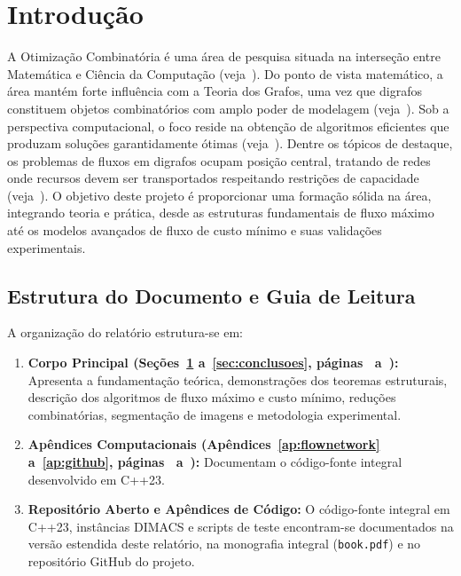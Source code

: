 \section{Introdução}\label{sec:introducao}
A Otimização Combinatória é uma área de pesquisa situada na interseção entre Matemática e Ciência da Computação (veja~\cite{korte2018combinatorial}). Do ponto de vista matemático, a área mantém forte influência com a Teoria dos Grafos, uma vez que digrafos constituem objetos combinatórios com amplo poder de modelagem (veja~\cite{bondy2008graph, diestel2017graph}).
Sob a perspectiva computacional, o foco reside na obtenção de algoritmos eficientes que produzam soluções garantidamente ótimas (veja~\cite{schrijver2003combinatorial, cook1998combinatorial}). Dentre os tópicos de destaque, os problemas de fluxos em digrafos ocupam posição central, tratando de redes onde recursos devem ser transportados respeitando restrições de capacidade (veja~\cite{ahuja1993network}).
O objetivo deste projeto é proporcionar uma formação sólida na área, integrando teoria e prática, desde as estruturas fundamentais de fluxo máximo até os modelos avançados de fluxo de custo mínimo e suas validações experimentais.

\subsection{Estrutura do Documento e Guia de Leitura}\label{sec:leitura}

A organização do relatório estrutura-se em:

\begin{enumerate}[leftmargin=1.5em, itemsep=0.15em, topsep=0.2em, parsep=0em]
    \item \textbf{Corpo Principal (Seções~\ref{sec:introducao} a~\ref{sec:conclusoes}, páginas~\pageref{sec:introducao} a~\pageref{sec:conclusoes}):} Apresenta a fundamentação teórica, demonstrações dos teoremas estruturais, descrição dos algoritmos de fluxo máximo e custo mínimo, reduções combinatórias, segmentação de imagens e metodologia experimental.
\ifapendicecodigo
    \item \textbf{Apêndices Computacionais (Apêndices~\ref{ap:flownetwork} a~\ref{ap:github}, páginas~\pageref{ap:flownetwork} a~\pageref{ap:github}):} Documentam o código-fonte integral desenvolvido em C++23.
\else
    \item \textbf{Repositório Aberto e Apêndices de Código:} O código-fonte integral em C++23, instâncias DIMACS e scripts de teste encontram-se documentados na versão estendida deste relatório, na monografia integral (\texttt{book.pdf}) e no repositório GitHub do projeto.
\fi
\end{enumerate}

